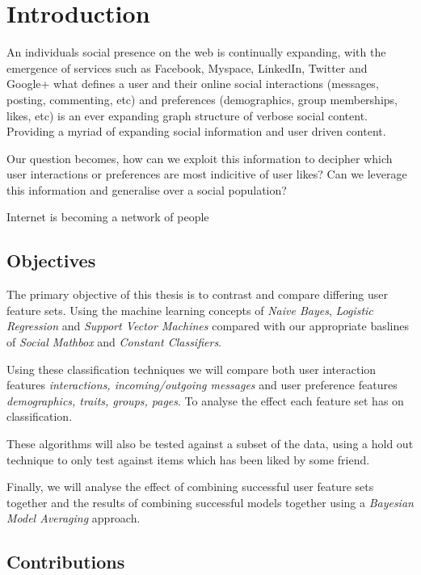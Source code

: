 
\chapter{Introduction}
\label{cha:intro}

An individuals social presence on the web is continually expanding, with the emergence of services such as Facebook, Myspace, LinkedIn, Twitter 
and Google+ what defines a user and their online social interactions (messages, posting, commenting, etc) and preferences 
(demographics, group memberships, likes, etc) is an ever expanding graph structure of verbose social content. Providing a myriad of expanding
social information and user driven content.

Our question becomes, how can we exploit this information to decipher which user interactions or preferences are most indicitive of user likes?
Can we leverage this information and generalise over a social population?

Internet is becoming a network of people

\section{Objectives}
\label{sec:objectives}

The primary objective of this thesis is to contrast and compare differing user feature sets. Using the
machine learning concepts of \emph{Naive Bayes}, \emph{Logistic Regression} and \emph{Support Vector Machines} compared with our 
appropriate baslines of \emph{Social Mathbox} and \emph{Constant Classifiers}.

Using these classification techniques we will compare both user interaction features 
\emph{interactions, incoming/outgoing messages} and user preference features \emph{demographics, traits, groups, pages}. To analyse the effect 
each feature set has on classification.

These algorithms will also be tested against a subset of the data, using a hold out technique to only test against items which has been liked
by some friend.

Finally, we will analyse the effect of combining successful user feature sets together and the results of combining successful models together 
using a \emph{Bayesian Model Averaging} approach.

\section{Contributions}
\label{sec:contributions}

